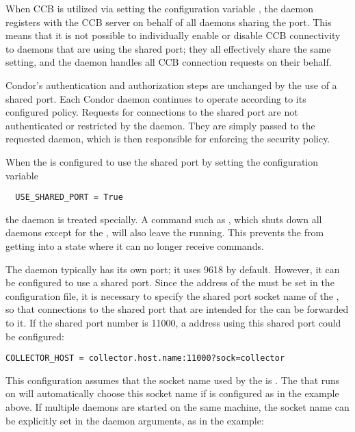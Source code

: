 When CCB is utilized via setting the configuration variable
,
the  daemon registers with
the CCB server on behalf of all daemons sharing the port.
This means that it is not possible to individually enable or disable
CCB connectivity to daemons that are using the shared port;
they all effectively share the same setting,
and the  daemon handles all CCB connection
requests on their behalf.

Condor's authentication and authorization steps are unchanged by the
use of a shared port.  Each Condor daemon continues to operate
according to its configured policy.  Requests for connections to the
shared port are not authenticated or restricted by
the  daemon.
They are simply passed to the requested daemon,
which is then responsible for enforcing the security policy.

When the  is configured to use the shared port
by setting the configuration variable
\begin{verbatim}
  USE_SHARED_PORT = True
\end{verbatim}
the  daemon is treated specially. 
A command such as ,
which shuts down all daemons except for the ,
will also leave the  running.
This prevents the  from getting into a state
where it can no longer receive commands.

The  daemon typically has its own port;
it uses 9618 by default.
However, it can be configured to use a shared port.
Since the address of the  must be set in 
the configuration file,
it is necessary to specify the shared port socket name of 
the ,
so that connections to the shared port that are intended for 
the  can be forwarded to it.
If the shared port number is 11000, a  address using this
shared port could be configured:

\footnotesize
\begin{verbatim}
COLLECTOR_HOST = collector.host.name:11000?sock=collector
\end{verbatim}
\normalsize

This configuration assumes that the socket name used by 
the  is .
The  that runs on 
will automatically choose this socket name if 
is configured as in the example above.
If multiple  daemons are started on the same
machine, the socket name can be explicitly set in the daemon arguments,
as in the example:

